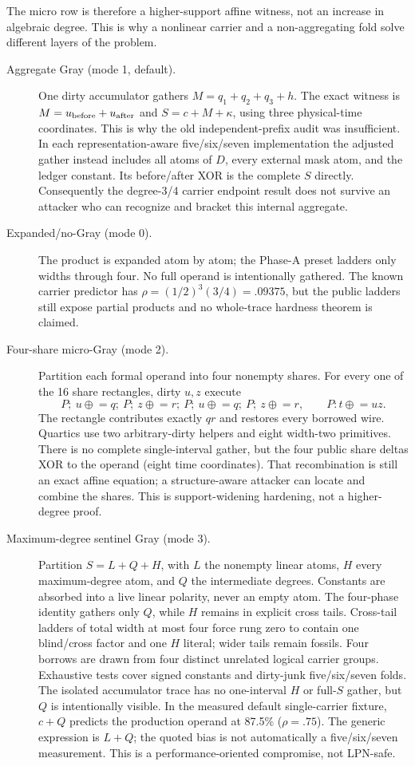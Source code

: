 \documentclass[11pt]{article}
\newcommand{\xor}{\oplus}
\begin{document}
The micro row is therefore a higher-support affine witness, not an increase in
algebraic degree.  This is
why a nonlinear carrier and a non-aggregating fold solve different layers of
the problem.

\begin{description}
\item[Aggregate Gray (mode 1, default).]
One dirty accumulator gathers $M=q_1+q_2+q_3+h$.  The exact witness is
$M=u_{\rm before}+u_{\rm after}$ and $S=c+M+\kappa$, using three
physical-time coordinates.  This is why the old independent-prefix audit was
insufficient.  In each representation-aware five/six/seven implementation the
adjusted gather instead includes all atoms of $D$, every external mask atom,
and the ledger constant.  Its before/after XOR is the complete $S$ directly.
Consequently the degree-3/4 carrier endpoint result does not survive an attacker
who can recognize and bracket this internal aggregate.

\item[Expanded/no-Gray (mode 0).]
The product is expanded atom by atom; the Phase-A preset ladders only widths
through four.  No full operand is intentionally gathered.  The known carrier
predictor has $\rho=(1/2)^3(3/4)=.09375$, but the public ladders still expose
partial products and no whole-trace hardness theorem is claimed.

\item[Four-share micro-Gray (mode 2).]
Partition each formal operand into four nonempty shares.  For every one of the
16 share rectangles, dirty $u,z$ execute
\[P;\ u\mathrel{\xor}=q;\ P;\ z\mathrel{\xor}=r;\ P;
  \ u\mathrel{\xor}=q;\ P;\ z\mathrel{\xor}=r,\qquad P:t\mathrel{\xor}=uz .\]
The rectangle contributes exactly $qr$ and restores every borrowed wire.
Quartics use two arbitrary-dirty helpers and eight width-two primitives.
There is no complete single-interval gather, but the four public share deltas
XOR to the operand (eight time coordinates).  That recombination is still an
exact affine equation; a structure-aware attacker can locate and combine the
shares.  This is support-widening hardening, not a higher-degree proof.

\item[Maximum-degree sentinel Gray (mode 3).]
Partition $S=L+Q+H$, with $L$ the nonempty linear atoms, $H$ every
maximum-degree atom, and $Q$ the intermediate degrees.  Constants are absorbed
into a live linear polarity, never an empty atom.  The four-phase identity
gathers only $Q$, while $H$ remains in explicit cross tails.  Cross-tail
ladders of total width at most four force rung zero to contain one blind/cross
factor and one $H$ literal; wider tails remain fossils.  Four borrows are drawn
from four distinct unrelated logical carrier groups.  Exhaustive tests cover
signed constants and dirty-junk five/six/seven folds.  The isolated accumulator
trace has no one-interval $H$ or full-$S$ gather, but $Q$ is intentionally
visible.  In the measured default single-carrier fixture, $c+Q$ predicts the
production operand at 87.5\% ($\rho=.75$).  The generic expression is $L+Q$;
the quoted bias is not automatically a five/six/seven measurement.  This is a
performance-oriented compromise, not LPN-safe.


\end{description}
\end{document}
